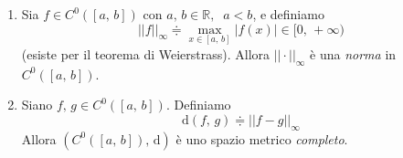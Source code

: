 \begin{lemma} \label{lemma_metrici} 
\mbox{}
\begin{enumerate}[labelindent=\parindent,leftmargin=*,label=\textnormal{(\roman*)},start=1]
\item Sia $f \in C^0([a,\,b])$ con $a,\,b \in \mathbb{R}, \; \; a<b$, e definiamo
$$
||f||_{\infty} \doteqdot \underset{x \in [a,\,b]}{\max} |f(x)| \in [0,\,+\infty)
$$
(esiste per il teorema di Weierstrass). Allora $||\cdot||_{\infty}$ è una \emph{norma} in $C^0([a,\,b])$.
\item Siano $f,\,g \in C^0([a,\,b])$. Definiamo
$$
\mathrm{d}(f,\,g) \doteqdot ||f-g||_{\infty}
$$
Allora $\left( C^0([a,\,b]),\,\mathrm{d} \right)$ è uno spazio metrico \emph{completo}.
\end{enumerate}
\end{lemma}
